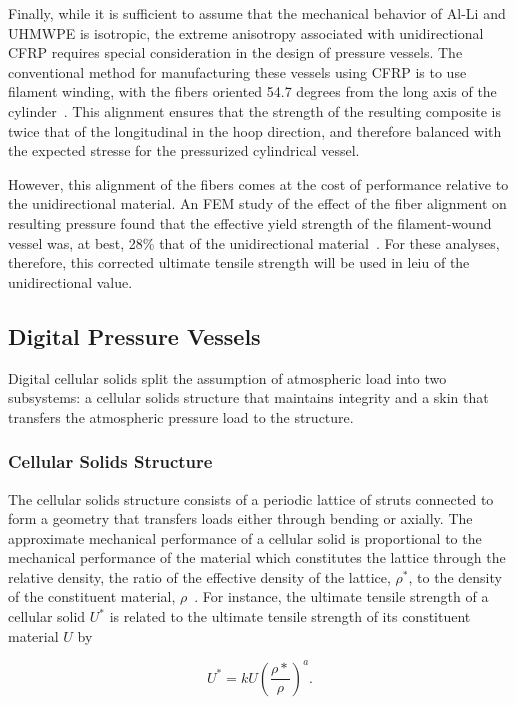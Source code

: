 \documentclass[twocolumn,letterpaper]{IEEEAerospaceCLS}  %
\begin{document}
Finally, while it is sufficient to assume that the mechanical behavior of Al-Li and UHMWPE is isotropic, the extreme anisotropy associated with unidirectional CFRP requires special consideration in the design of pressure vessels. The conventional method for manufacturing these vessels using CFRP is to use filament winding, with the fibers oriented 54.7 degrees from the long axis of the cylinder~\cite{sulaiman2013finite}. This alignment ensures that the strength of the resulting composite is twice that of the longitudinal in the hoop direction, and therefore balanced with the expected stresse for the pressurized cylindrical vessel. 

However, this alignment of the fibers comes at the cost of performance relative to the unidirectional material. An FEM study of the effect of the fiber alignment on resulting pressure found that the effective yield strength of the filament-wound vessel was, at best, 28\% that of the unidirectional material~\cite{sulaiman2013finite}. For these analyses, therefore, this corrected ultimate tensile strength will be used in leiu of the unidirectional value. 

\subsection{Digital Pressure Vessels}
Digital cellular solids split the assumption of atmospheric load into two subsystems: a cellular solids structure that maintains integrity and a skin that transfers the atmospheric pressure load to the structure. 

\subsubsection{Cellular Solids Structure}
The cellular solids structure consists of a periodic lattice of struts connected to form a geometry that transfers loads either through bending or axially. The approximate mechanical performance of a cellular solid is proportional to the mechanical performance of the material which constitutes the lattice through the relative density, the ratio of the effective density of the lattice, $\rho^*$, to the density of the constituent material, $\rho$~\cite{deshpande2001effective}. For instance, the ultimate tensile strength of a cellular solid $U^*$ is related to the ultimate tensile strength of its constituent material $U$ by

\begin{equation}
\label{reldenmech}
	U^* = kU\left(\frac{\rho*}{\rho}\right)^a.
\end{equation}
\end{document}
